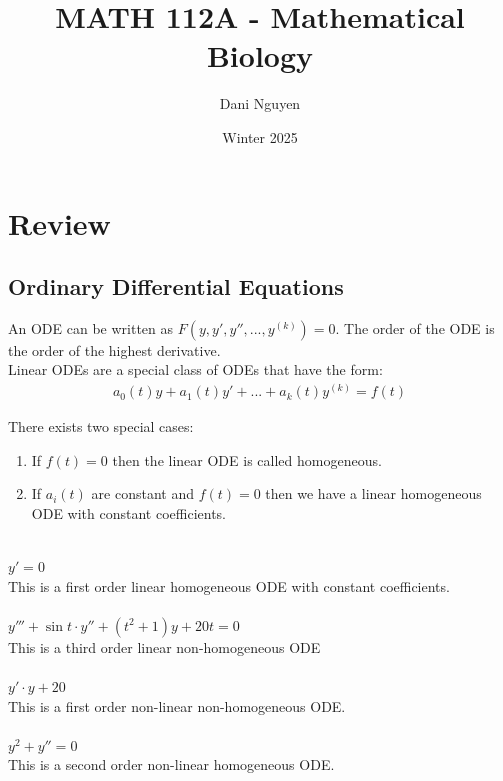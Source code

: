 \documentclass[12pt, letterpaper]{article}
\title{MATH 112A - Mathematical Biology}
\author{Dani Nguyen}
\date{Winter 2025}
\begin{document}
\maketitle
\tableofcontents

\section{Review}
\subsection{Ordinary Differential Equations}
An ODE can be written as $F(y,y',y'', ..., y^{(k)})=0$. The order of the ODE is the order of the highest derivative. \\

\noindent Linear ODEs are a special class of ODEs that have the form:
\begin{align*}
    a_0(t)y+a_1(t)y'+...+a_k(t)y^{(k)} = f(t)
\end{align*}

\noindent There exists two special cases:
\begin{enumerate}
    \item If $f(t) = 0$ then the linear ODE is called homogeneous.
    \item If $a_i(t)$ are constant and $f(t)=0$ then we have a linear homogeneous ODE with constant coefficients.
\end{enumerate}
 \\
$y' = 0$ \\
This is a first order linear homogeneous ODE with constant coefficients. \\ \\
$y'''+ \sin t\cdot y'' + (t^2+1)y+20t =0$ \\ 
This is a third order linear non-homogeneous ODE \\ \\ 
$y'\cdot y +20$ \\ 
This is a first order non-linear non-homogeneous ODE. \\ \\
$y^2+y''=0$ \\
This is a second order non-linear homogeneous ODE. \\ \\
\end{document}

